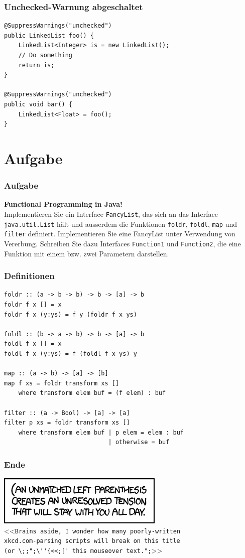 \documentclass{beamer}
\begin{document}
\begin{frame}[fragile]
\frametitle{Unchecked-Warnung abgeschaltet}
\begin{verbatim}
@SuppressWarnings("unchecked")
public LinkedList foo() {
    LinkedList<Integer> is = new LinkedList();
    // Do something
    return is;
}

@SuppressWarnings("unchecked")
public void bar() {
    LinkedList<Float> = foo();
}
\end{verbatim}
\end{frame}

\section{Aufgabe}
\begin{frame}[fragile]
\frametitle{Aufgabe}
\textbf{Functional Programming in Java!}\\\vspace{1\baselineskip}
\pause
Implementieren Sie ein Interface \verb|FancyList|, das sich an das
Interface \verb|java.util.List| h\"{a}lt und ausserdem die Funktionen
\verb|foldr|, \verb|foldl|, \verb|map| und \verb|filter| definiert.
Implementieren Sie eine FancyList unter Verwendung von Vererbung.
Schreiben Sie dazu Interfaces \verb|Function1| und \verb|Function2|,
die eine Funktion mit einem bzw. zwei Parametern darstellen.
\end{frame}

\begin{frame}
\frametitle{Definitionen}
\begin{verbatim}
foldr :: (a -> b -> b) -> b -> [a] -> b
foldr f x [] = x
foldr f x (y:ys) = f y (foldr f x ys)

foldl :: (b -> a -> b) -> b -> [a] -> b
foldl f x [] = x
foldl f x (y:ys) = f (foldl f x ys) y

map :: (a -> b) -> [a] -> [b]
map f xs = foldr transform xs []
    where transform elem buf = (f elem) : buf

filter :: (a -> Bool) -> [a] -> [a]
filter p xs = foldr transform xs []
    where transform elem buf | p elem = elem : buf
                             | otherwise = buf
\end{verbatim}
\end{frame}

\begin{frame}[fragile]
\frametitle{Ende}
\includegraphics[scale=1.0]{(.png}\\\vspace{1\baselineskip}
<<\verb|Brains aside, I wonder how many poorly-written|\\
\verb|xkcd.com-parsing scripts will break on this title|\\
\verb|(or \;;";\''{<<;[' this mouseover text.";|>>
\end{frame}
\end{document}
